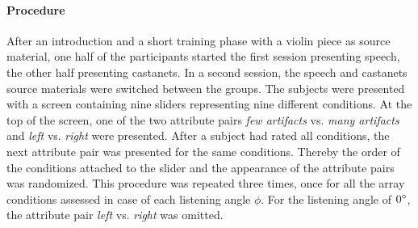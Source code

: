 \paragraph{Procedure}
After an introduction and a short training phase with a violin piece as source
material, one half of the participants started the first session
presenting speech, the other half presenting castanets.
In a second session, the speech and castanets source materials were switched
between the groups. The subjects were presented with a screen
containing nine sliders representing nine different conditions.
At the top of the screen, one of the two attribute pairs  \emph{few artifacts}
vs. \emph{many artifacts} and \emph{left} vs. \emph{right} were presented.
After a subject had rated all conditions, the next
attribute pair was presented for the same conditions.
Thereby the order of the
conditions attached to the slider and the appearance of the
attribute pairs was randomized. This procedure was repeated
three times, once for all the array conditions assessed in case of each
listening angle $\phi$.
For the listening angle of $0^\circ$, the attribute pair
\emph{left} vs. \emph{right} was omitted.


